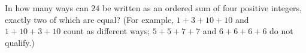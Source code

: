 In how many ways can $24$ be written as an ordered sum of four positive integers, exactly two of which are equal? (For example, $1+3+10+10$ and $1+10+3+10$ count as different ways; $5+5+7+7$ and $6+6+6+6$ do not qualify.)
